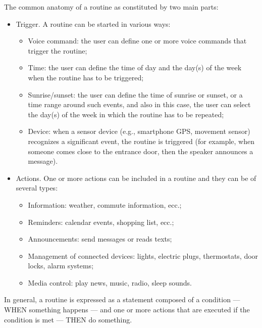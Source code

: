 The common anatomy of a routine as constituted by two main parts:
\begin{itemize}
    \item Trigger. A routine can be started in various ways:
        \begin{itemize}
            \item Voice command: the user can define one or more voice commands that trigger the routine;
            \item Time: the user can define the time of day and the day(s) of the week when the routine has to be triggered;
            \item Sunrise/sunset: the user can define the time of sunrise or sunset, or a time range around such events, and also in this case, the user can select the day(s) of the week in which the routine has to be repeated;
            \item Device: when a sensor device (e.g., smartphone GPS, movement sensor) recognizes a significant event, the routine is triggered (for example, when someone comes close to the entrance door, then the speaker announces a message).
        \end{itemize}
    \item Actions. One or more actions can be included in a routine and they can be of several types:
        \begin{itemize}
            \item Information: weather, commute information, ecc.;
            \item Reminders: calendar events, shopping list, ecc.;
            \item Announcements: send messages or reads texts;
            \item Management of connected devices: lights, electric plugs, thermostats, door locks, alarm systems;
            \item Media control: play news, music, radio, sleep sounds.
        \end{itemize}
\end{itemize}

In general, a routine is expressed as a statement composed of a condition --- WHEN something happens --- and one or more actions that are executed if the condition is met --- THEN do something.
